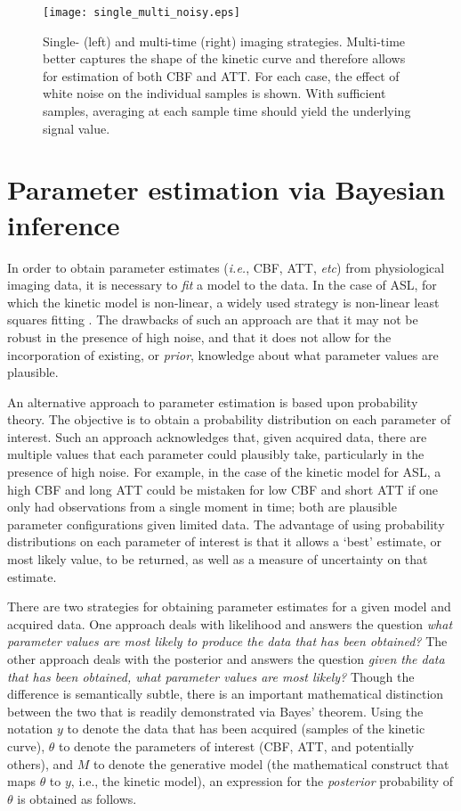\begin{figure}
\centering
\texttt{[image: single\_multi\_noisy.eps]}
\caption{Single- (left) and multi-time (right) imaging strategies. Multi-time better captures the shape of the kinetic curve and therefore allows for estimation of both CBF and ATT. For each case, the effect of white noise on the individual samples is shown. With sufficient samples, averaging at each sample time should yield the underlying signal value.}
\label{single_multi_noisy}
\end{figure}

\section{Parameter estimation via Bayesian inference}
\label{lit_vb}

In order to obtain parameter estimates (\textit{i.e.}, CBF, ATT, \textit{etc}) from physiological imaging data, it is necessary to \textit{fit} a model to the data. In the case of ASL, for which the kinetic model is non-linear, a widely used strategy is non-linear least squares fitting \cite{Chappell2009}. The drawbacks of such an approach are that it may not be robust in the presence of high noise, and that it does not allow for the incorporation of existing, or \textit{prior}, knowledge about what parameter values are plausible. 

An alternative approach to parameter estimation is based upon probability theory. The objective is to obtain a probability distribution on each parameter of interest. Such an approach acknowledges that, given acquired data, there are multiple values that each parameter could plausibly take, particularly in the presence of high noise. For example, in the case of the kinetic model for ASL, a high CBF and long ATT could be mistaken for low CBF and short ATT if one only had observations from a single moment in time; both are plausible parameter configurations given limited data. The advantage of using probability distributions on each parameter of interest is that it allows a `best' estimate, or most likely value, to be returned, as well as a measure of uncertainty on that estimate. 

There are two strategies for obtaining parameter estimates for a given model and acquired data. One approach deals with likelihood and answers the question \textit{what parameter values are most likely to produce the data that has been obtained?} The other approach deals with the posterior and answers the question \textit{given the data that has been obtained, what parameter values are most likely?} Though the difference is semantically subtle, there is an important mathematical distinction between the two that is readily demonstrated via Bayes' theorem. Using the notation $y$ to denote the data that has been acquired (samples of the kinetic curve), $\theta$ to denote the parameters of interest (CBF, ATT, and potentially others), and $M$ to denote the generative model (the mathematical construct that maps $\theta$ to $y$, i.e., the kinetic model), an expression for the \textit{posterior} probability of $\theta$ is obtained as follows. 

